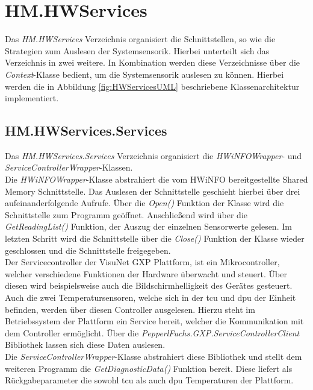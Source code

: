 \section{HM.HWServices}
Das \textit{HM.HWServices} Verzeichnis organisiert die Schnittstellen, so wie die Strategien zum Auslesen der Systemsensorik. Hierbei unterteilt sich das Verzeichnis in zwei weitere. In Kombination werden diese Verzeichnisse über die \textit{Context}-Klasse bedient, um die Systemsensorik auslesen zu können. Hierbei werden die in Abbildung \ref{fig:HWServicesUML} beschriebene Klassenarchitektur implementiert.

\subsection{HM.HWServices.Services}
Das \textit{HM.HWServices.Services} Verzeichnis organisiert die \textit{HWiNFOWrapper}- und \textit{ServiceControllerWrapper}-Klassen.\\
Die \textit{HWiNFOWrapper}-Klasse abstrahiert die vom HWiNFO bereitgestellte Shared Memory Schnittstelle. Das Auslesen der Schnittstelle geschieht hierbei über drei aufeinanderfolgende Aufrufe. Über die \textit{Open()} Funktion der Klasse wird die Schnittstelle zum Programm geöffnet. Anschließend wird über die \textit{GetReadingList()} Funktion, der Auszug der einzelnen Sensorwerte gelesen. Im letzten Schritt wird die Schnittstelle über die \textit{Close()} Funktion der Klasse wieder geschlossen und die Schnittstelle freigegeben.\\
Der Servicecontroller der VisuNet GXP Plattform, ist ein Mikrocontroller, welcher verschiedene Funktionen der Hardware überwacht und steuert. Über diesen wird beispielsweise auch die Bildschirmhelligkeit des Gerätes gesteuert. Auch die zwei Temperatursensoren, welche sich in der \ac{tcu} und \ac{dpu} der Einheit befinden, werden über diesen Controller ausgelesen. Hierzu steht im Betriebssystem der Plattform ein Service bereit, welcher die Kommunikation mit dem Controller ermöglicht. Über die \textit{PepperlFuchs.GXP.ServiceControllerClient} Bibliothek lassen sich diese Daten auslesen.\\
Die \textit{ServiceControllerWrapper}-Klasse abstrahiert diese Bibliothek und stellt dem weiteren Programm die \textit{GetDiagnosticData()} Funktion bereit. Diese liefert als Rückgabeparameter die sowohl \ac{tcu} als auch \ac{dpu} Temperaturen der Plattform.


